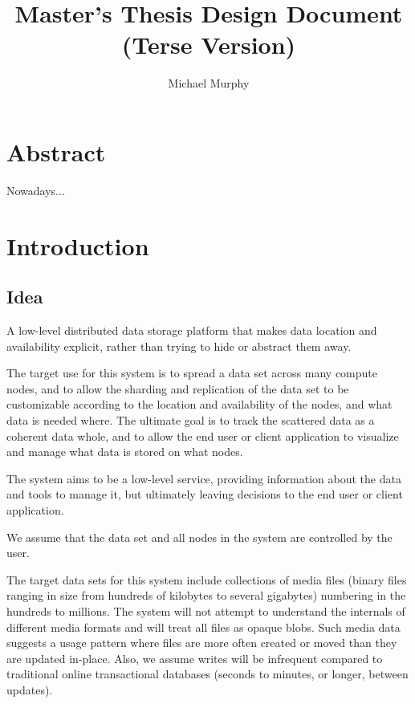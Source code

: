 \documentclass[12pt,a4paper,two-side]{book}
\begin{document}
\title{Master's Thesis Design Document \\ (Terse Version)}
\author{Michael Murphy}
\maketitle

\frontmatter

\chapter{Abstract}
  Nowadays...

\tableofcontents

{}

\listoffigures
{}

\listoftables
{}

\lstlistoflistings
{}

\mainmatter

\chapter{Introduction}

\section{Idea}\label{idea}

A low-level distributed data storage platform that makes data location and
availability explicit, rather than trying to hide or abstract them away.

The target use for this system is to spread a data set across many compute
nodes, and to allow the sharding and replication of the data set to be
customizable according to the location and availability of the nodes, and what
data is needed where. The ultimate goal is to track the scattered data as a
coherent data whole, and to allow the end user or client application to
visualize and manage what data is stored on what nodes.

The system aims to be a low-level service, providing information about the data
and tools to manage it, but ultimately leaving decisions to the end user or
client application.

We assume that the data set and all nodes in the system are controlled by the
user.

The target data sets for this system include collections of media files (binary
files ranging in size from hundreds of kilobytes to several gigabytes) numbering
in the hundreds to millions. The system will not attempt to understand the
internals of different media formats and will treat all files as opaque blobs.
Such media data suggests a usage pattern where files are more often created or
moved than they are updated in-place. Also, we assume writes will be infrequent
compared to traditional online transactional databases (seconds to minutes, or
longer, between updates).
\end{document}

